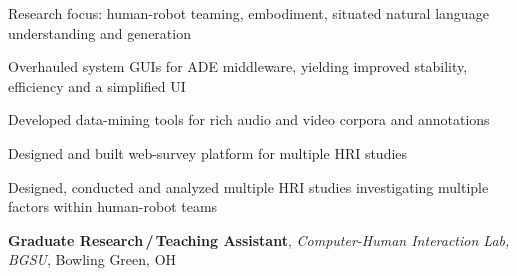 \documentclass[10pt, letter]{article}
\newcommand{\years}[1]{\marginnote{\footnotesize #1}}
\newenvironment{desc*}{
  \begin{description}
    \setlength{\itemsep}{0.2pt}
    \setlength{\parskip}{-1pt}
    \setlength{\parsep}{0pt}
  }{
  \end{description}
}
\begin{document}
Research focus: human-robot teaming, embodiment, situated natural language understanding and generation
\begin{itemize}[leftmargin=*, parsep=1pt, rightmargin=1.5cm]
  {\light
\item Overhauled system GUIs for ADE middleware, yielding improved
  stability, efficiency and a simplified UI
\item Developed data-mining tools for rich audio and video corpora and annotations
\item Designed and built web-survey platform for multiple HRI studies
\item Designed, conducted and analyzed multiple HRI studies
  investigating multiple factors within human-robot teams
  }
\end{itemize}
\bigskip
\years{2010 - 2012}
\textbf{Graduate Research\,/\,Teaching Assistant}, 
\textit{Computer-Human Interaction Lab, BGSU}, Bowling Green, OH \bigskip
\end{document}

